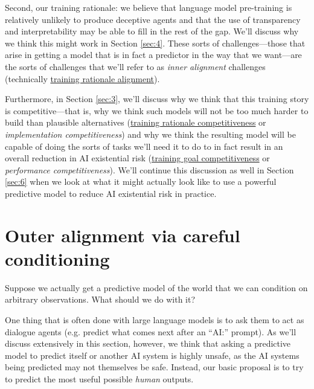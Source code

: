 \documentclass[
  twocolumn,
  natbib,
]{miri-tech-article}
\begin{document}
Second, our training rationale: we believe that language model pre-training is relatively unlikely to produce deceptive agents and that the use of transparency and interpretability may be able to fill in the rest of the gap. We'll discuss why we think this might work in Section \ref{sec:4}. These sorts of challenges---those that arise in getting a model that is in fact a predictor in the way that we want---are the sorts of challenges that we'll refer to as \textit{inner alignment} challenges (technically \href{https://www.alignmentforum.org/posts/FDJnZt8Ks2djouQTZ/how-do-we-become-confident-in-the-safety-of-a-machine#Evaluating_proposals_for_building_safe_advanced_AI}{training rationale alignment}\cite{how_become_confident}).

Furthermore, in Section \ref{sec:3}, we'll discuss why we think that this training story is competitive---that is, why we think such models will not be too much harder to build than plausible alternatives (\href{https://www.alignmentforum.org/posts/FDJnZt8Ks2djouQTZ/how-do-we-become-confident-in-the-safety-of-a-machine#Evaluating_proposals_for_building_safe_advanced_AI}{training rationale competitiveness}\cite{how_become_confident} or \textit{implementation competitiveness}) and why we think the resulting model will be capable of doing the sorts of tasks we'll need it to do to in fact result in an overall reduction in AI existential risk (\href{https://www.alignmentforum.org/posts/FDJnZt8Ks2djouQTZ/how-do-we-become-confident-in-the-safety-of-a-machine#Evaluating_proposals_for_building_safe_advanced_AI}{training goal competitiveness}\cite{how_become_confident} or \textit{performance competitiveness}). We'll continue this discussion as well in Section \ref{sec:6} when we look at what it might actually look like to use a powerful predictive model to reduce AI existential risk in practice.


\section{Outer alignment via careful conditioning}
\label{sec:2}

Suppose we actually get a predictive model of the world that we can condition on arbitrary observations. What should we do with it?

One thing that is often done with large language models is to ask them to act as dialogue agents (e.g. predict what comes next after an ``AI:'' prompt). As we'll discuss extensively in this section, however, we think that asking a predictive model to predict itself or another AI system is highly unsafe, as the AI systems being predicted may not themselves be safe. Instead, our basic proposal is to try to predict the most useful possible \textit{human} outputs.
\end{document}
